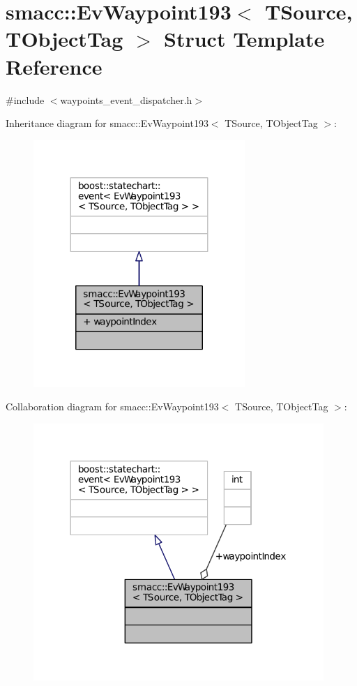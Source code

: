 \hypertarget{structsmacc_1_1EvWaypoint193}{}\section{smacc\+:\+:Ev\+Waypoint193$<$ T\+Source, T\+Object\+Tag $>$ Struct Template Reference}
\label{structsmacc_1_1EvWaypoint193}


{\ttfamily \#include $<$waypoints\+\_\+event\+\_\+dispatcher.\+h$>$}



Inheritance diagram for smacc\+:\+:Ev\+Waypoint193$<$ T\+Source, T\+Object\+Tag $>$\+:
\nopagebreak
\begin{figure}[H]
\begin{center}
\leavevmode
\includegraphics[width=227pt]{structsmacc_1_1EvWaypoint193__inherit__graph}
\end{center}
\end{figure}


Collaboration diagram for smacc\+:\+:Ev\+Waypoint193$<$ T\+Source, T\+Object\+Tag $>$\+:
\nopagebreak
\begin{figure}[H]
\begin{center}
\leavevmode
\includegraphics[width=312pt]{structsmacc_1_1EvWaypoint193__coll__graph}
\end{center}
\end{figure}
